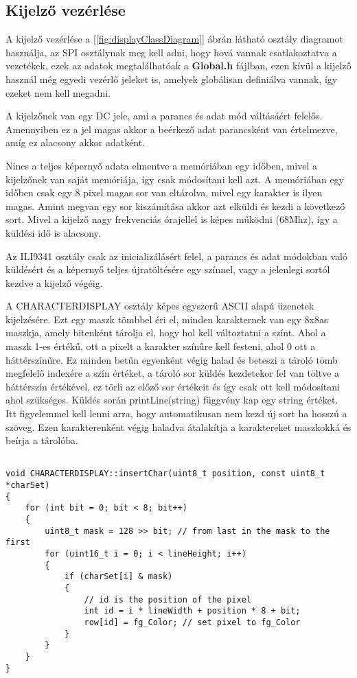 \subsection{Kijelző vezérlése}

A kijelző vezérlése a [\ref{fig:displayClassDiagram}] ábrán látható osztály diagramot használja, 
az SPI osztálynak meg kell adni, hogy hová vannak csatlakoztatva a vezetékek, 
ezek az adatok megtalálhatóak a \textbf{Global.h} fájlban, ezen kívül a 
kijelző használ még egyedi vezérlő jeleket is, amelyek globálisan definiálva vannak,
így ezeket nem kell megadni. 

A kijelzőnek van egy DC jele, ami a parancs és adat mód váltásáért felelős.
Amennyiben ez a jel magas akkor a beérkező adat parancsként van értelmezve, amíg 
ez alacsony akkor adatként.

Nincs a teljes képernyő adata elmentve a memóriában egy időben, mivel a kijelzőnek
van saját memóriája, így csak módosítani kell azt. A memóriában egy időben csak 
egy 8 pixel magas sor van eltárolva, mivel egy karakter is ilyen magas.
Amint megvan egy sor kiszámítása akkor azt elküldi és kezdi a következő sort.
Mivel a kijelző nagy frekvenciás órajellel is képes működni (68Mhz), így a küldési
idő is alacsony.

Az ILI9341 osztály csak az inicializálásért felel, a parancs és adat 
módokban való küldésért és a képernyő teljes újratöltésére egy színnel, vagy a jelenlegi
sortól kezdve a kijelző végéig.

A CHARACTERDISPLAY osztály képes egyszerű ASCII alapú üzenetek kijelzésére.
Ezt egy maszk tömbbel éri el, minden karakternek van egy 8x8as maszkja, amely
bitenként tárolja el, hogy hol kell változtatni a színt.
Ahol a maszk 1-es értékű, ott a pixelt a karakter színűre kell festeni, ahol 0
ott a háttérszínűre.
Ez minden betűn egyenként végig halad és beteszi a tároló tömb megfelelő indexére
a szín értéket, a tároló sor küldés kezdetekor fel van töltve a háttérszín 
értékével, ez törli az előző sor értékeit és így csak ott kell módosítani
ahol szükséges.
Küldés során printLine(string) függvény kap egy string értéket.
Itt figyelemmel kell lenni arra, hogy automatikusan nem kezd új sort
ha hosszú a szöveg. Ezen karakterenként végig haladva átalakítja a karaktereket maszkokká
és beírja a tárolóba.


\begin{lstlisting}

void CHARACTERDISPLAY::insertChar(uint8_t position, const uint8_t *charSet)
{
    for (int bit = 0; bit < 8; bit++)
    {
        uint8_t mask = 128 >> bit; // from last in the mask to the first
        for (uint16_t i = 0; i < lineHeight; i++)
        {
            if (charSet[i] & mask)
            {
                // id is the position of the pixel
                int id = i * lineWidth + position * 8 + bit;
                row[id] = fg_Color; // set pixel to fg_Color
            }
        }
    }
}

\end{lstlisting}


